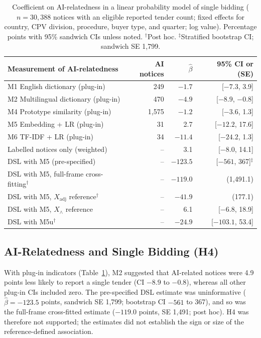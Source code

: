 \documentclass[runningheads]{llncs}
\begin{document}
\begin{table}[t]
\caption{Coefficient on AI-relatedness in a linear probability model of single bidding ($n=30{,}388$ notices with an eligible reported tender count; fixed effects for country, CPV division, procedure, buyer type, and quarter; log value). Percentage points with 95\% sandwich CIs unless noted. $^\dagger$Post hoc. $^\ddagger$Stratified bootstrap CI; sandwich SE 1,799.}\label{tab:reg}
\centering
\begin{tabular}{lrrr}
\toprule
Measurement of AI-relatedness & AI notices & $\hat\beta$ & 95\% CI or (SE) \\
\midrule
M1 English dictionary (plug-in) & 249 & $-1.7$ & [$-7.3$, 3.9] \\
M2 Multilingual dictionary (plug-in) & 470 & $-4.9$ & [$-8.9$, $-0.8$] \\
M4 Prototype similarity (plug-in) & 1,575 & $-1.2$ & [$-3.6$, 1.3] \\
M5 Embedding + LR (plug-in) & 31 & 2.7 & [$-12.2$, 17.6] \\
M6 TF-IDF + LR (plug-in) & 34 & $-11.4$ & [$-24.2$, 1.3] \\
Labelled notices only (weighted) & -- & 3.1 & [$-8.0$, 14.1] \\
DSL with M5 (pre-specified) & -- & $-123.5$ & [$-561$, 367]$^\ddagger$ \\
DSL with M5, full-frame cross-fitting$^\dagger$ & -- & $-119.0$ & (1,491.1) \\
DSL with M5, $X_{\mathrm{adj}}$ reference$^\dagger$ & -- & $-41.9$ & (177.1) \\
DSL with M5, $X_\wedge$ reference & -- & 6.1 & [$-6.8$, 18.9] \\
DSL with M5u$^\dagger$ & -- & $-24.9$ & [$-103.1$, 53.4] \\
\bottomrule
\end{tabular}
\end{table}

\subsection{AI-Relatedness and Single Bidding (H4)}
\label{sec:reg}
With plug-in indicators (Table~\ref{tab:reg}), M2 suggested that AI-related notices were 4.9 points less likely to report a single tender (CI $-8.9$ to $-0.8$), whereas all other plug-in CIs included zero. The pre-specified DSL estimate was uninformative ($\hat\beta=-123.5$ points, sandwich SE 1,799; bootstrap CI $-561$ to 367), and so was the full-frame cross-fitted estimate ($-119.0$ points, SE 1,491; post hoc). H4 was therefore not supported; the estimates did not establish the sign or size of the reference-defined association.
\end{document}
